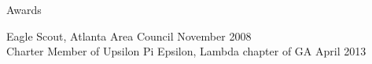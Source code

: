 \documentclass[11pt]{resume} %
\begin{document}

\begin{rSection}{Awards}

{Eagle Scout, Atlanta Area Council} \hfill November 2008\\
{Charter Member of Upsilon Pi Epsilon, Lambda chapter of GA} \hfill April 2013 \\

\end{rSection}






\end{document}
